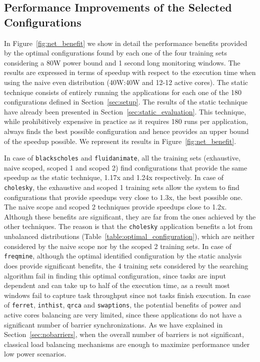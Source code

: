 \subsection{Performance Improvements of the Selected Configurations}
In Figure~\ref{fig:net_benefit} we show in detail the performance benefits provided by the
optimal configurations found by each one of the four training sets considering a 80W power
bound and 1 second long monitoring windows.  The results are expressed in terms of speedup
with respect to the execution time when using the naive even distribution (40W:40W and
12-12 active cores).  The static technique consists of entirely running the applications
for each one of the 180 configurations defined in Section~\ref{sec:setup}.  The results of
the static technique have already been presented in Section~\ref{sec:static_evaluation}.
This technique, while prohibitively expensive in practice as it requires 180 runs per
application, always finds the best possible configuration and hence provides an upper
bound of the speedup possible. We represent its results in Figure~\ref{fig:net_benefit}.

In case of \texttt{blackscholes} and \texttt{fluidanimate}, all the training sets
(exhaustive, naive scoped, scoped 1 and scoped 2) find configurations that provide the
same speedup as the static technique, 1.17x and 1.24x respectively.  In case of
\texttt{cholesky}, the exhaustive and scoped 1 training sets allow the system to find
configurations that provide speedups very close to 1.3x, the best possible one.  The naive
scope and scoped 2 techniques provide speedups close to 1.2x.  Although these benefits are
significant, they are far from the ones achieved by the other techniques.  The reason is
that the \texttt{cholesky} application benefits a lot from unbalanced distributions
(Table~\ref{table:optimal_configuration}), which are neither considered by the naive scope
nor by the scoped 2 training sets.  In case of \texttt{freqmine}, although the optimal
identified configuration by the static analysis does provide significant benefits, the 4
training sets considered by the searching algorithm fail in finding this optimal
configuration, since tasks are input dependent and can take up to half of the execution
time, as a result most windows fail to capture task throughput since not tasks finish
execution.  In case of \texttt{ferret}, \texttt{inthist}, \texttt{qrca} and
\texttt{swaptions}, the potential benefits of power and active cores balancing are very
limited, since these applications do not have a significant number of barrier
synchronizations.  As we have explained in Section~\ref{sec:nobarriers}, when the overall
number of barriers is not significant, classical load balancing mechanisms are enough to
maximize performance under low power scenarios.

